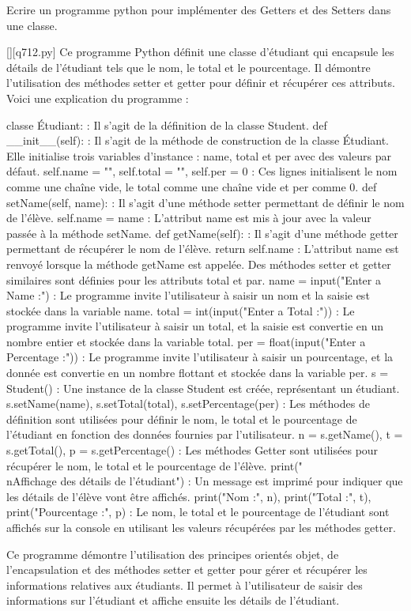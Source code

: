         \question
        Ecrire un programme python pour implémenter des Getters et des Setters dans une classe.
        \par
        \begin{solution}
            \renewcommand{\nomfichier}{q712.py}
            \pythonfile{\chemincode \nomfichier}[][\nomfichier]
            Ce programme Python définit une classe d'étudiant qui encapsule les détails de l'étudiant tels que le nom, le total et le pourcentage. Il démontre l'utilisation des méthodes setter et getter pour définir et récupérer ces attributs. Voici une explication du programme :

    classe Étudiant: : Il s'agit de la définition de la classe Student.
    def \_\_init\_\_(self): : Il s'agit de la méthode de construction de la classe Étudiant. Elle initialise trois variables d'instance : name, total et per avec des valeurs par défaut.
    self.name = "", self.total = "", self.per = 0 : Ces lignes initialisent le nom comme une chaîne vide, le total comme une chaîne vide et per comme 0.
    def setName(self, name): : Il s'agit d'une méthode setter permettant de définir le nom de l'élève.
    self.name = name : L'attribut name est mis à jour avec la valeur passée à la méthode setName.
    def getName(self): : Il s'agit d'une méthode getter permettant de récupérer le nom de l'élève.
    return self.name : L'attribut name est renvoyé lorsque la méthode getName est appelée.
    Des méthodes setter et getter similaires sont définies pour les attributs total et par.
    name = input("Enter a Name :") : Le programme invite l'utilisateur à saisir un nom et la saisie est stockée dans la variable name.
    total = int(input("Enter a Total :")) : Le programme invite l'utilisateur à saisir un total, et la saisie est convertie en un nombre entier et stockée dans la variable total.
    per = float(input("Enter a Percentage :")) : Le programme invite l'utilisateur à saisir un pourcentage, et la donnée est convertie en un nombre flottant et stockée dans la variable per.
    s = Student() : Une instance de la classe Student est créée, représentant un étudiant.
    s.setName(name), s.setTotal(total), s.setPercentage(per) : Les méthodes de définition sont utilisées pour définir le nom, le total et le pourcentage de l'étudiant en fonction des données fournies par l'utilisateur.
    n = s.getName(), t = s.getTotal(), p = s.getPercentage() : Les méthodes Getter sont utilisées pour récupérer le nom, le total et le pourcentage de l'élève.
    print("\\nAffichage des détails de l'étudiant") : Un message est imprimé pour indiquer que les détails de l'élève vont être affichés.
    print("Nom :", n), print("Total :", t), print("Pourcentage :", p) : Le nom, le total et le pourcentage de l'étudiant sont affichés sur la console en utilisant les valeurs récupérées par les méthodes getter.

Ce programme démontre l'utilisation des principes orientés objet, de l'encapsulation et des méthodes setter et getter pour gérer et récupérer les informations relatives aux étudiants. Il permet à l'utilisateur de saisir des informations sur l'étudiant et affiche ensuite les détails de l'étudiant.
        \end{solution}
        

